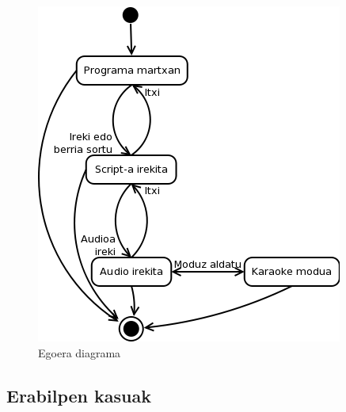 \begin{figure}[htp]
\begin{center}
\includegraphics[scale=0.6]{Pictures/Chapter4/Analisia/ED.png}
\caption{Egoera diagrama}
\label{ed}
\end{center}
\end{figure}
\newpage
\subsection{Erabilpen kasuak}

